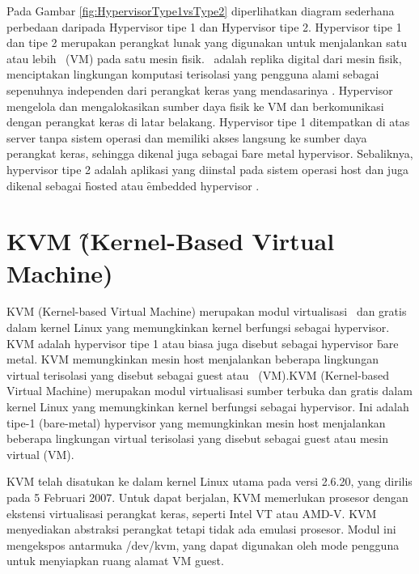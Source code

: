 Pada Gambar \ref{fig:HypervisorType1vsType2} diperlihatkan diagram sederhana perbedaan daripada Hypervisor tipe 1 dan Hypervisor tipe 2. Hypervisor tipe 1 dan tipe 2 merupakan perangkat lunak yang digunakan untuk menjalankan satu atau lebih \vm\ (VM) pada satu mesin fisik. \vm\ adalah replika digital dari mesin fisik, menciptakan lingkungan komputasi terisolasi yang pengguna alami sebagai sepenuhnya independen dari perangkat keras yang mendasarinya \cite{hypervisor1vs2}. Hypervisor mengelola dan mengalokasikan sumber daya fisik ke VM dan berkomunikasi dengan perangkat keras di latar belakang. Hypervisor tipe 1 ditempatkan di atas server tanpa sistem operasi dan memiliki akses langsung ke sumber daya perangkat keras, sehingga dikenal juga sebagai \f{bare metal} hypervisor. Sebaliknya, hypervisor tipe 2 adalah aplikasi yang diinstal pada sistem operasi host dan juga dikenal sebagai \f{hosted} atau \f{embedded} hypervisor \cite{hypervisor1vs2}.


\section{KVM \f{(Kernel-Based Virtual Machine)}}

KVM (Kernel-based Virtual Machine) merupakan modul virtualisasi \oss\ dan gratis dalam kernel Linux yang memungkinkan kernel berfungsi sebagai hypervisor. KVM adalah hypervisor tipe 1 atau biasa juga disebut sebagai hypervisor \f{bare metal}. KVM memungkinkan mesin host menjalankan beberapa lingkungan virtual terisolasi yang disebut sebagai guest atau \vm\ (VM).KVM (Kernel-based Virtual Machine) merupakan modul virtualisasi sumber terbuka dan gratis dalam kernel Linux yang memungkinkan kernel berfungsi sebagai hypervisor. Ini adalah tipe-1 (bare-metal) hypervisor yang memungkinkan mesin host menjalankan beberapa lingkungan virtual terisolasi yang disebut sebagai guest atau mesin virtual (VM).

KVM telah disatukan ke dalam kernel Linux utama pada versi 2.6.20, yang dirilis pada 5 Februari 2007. Untuk dapat berjalan, KVM memerlukan prosesor dengan ekstensi virtualisasi perangkat keras, seperti Intel VT atau AMD-V. KVM menyediakan abstraksi perangkat tetapi tidak ada emulasi prosesor. Modul ini mengekspos antarmuka /dev/kvm, yang dapat digunakan oleh mode pengguna untuk menyiapkan ruang alamat VM guest.

